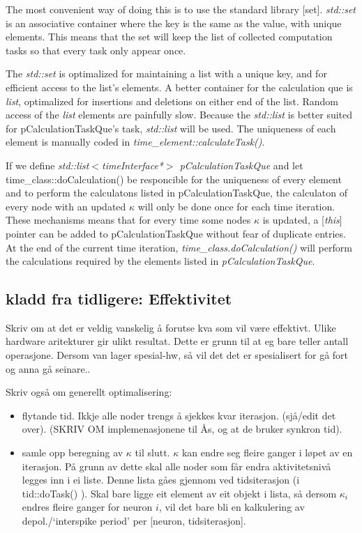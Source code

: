 The most convenient way of doing this is to use the standard library [set]. %
\emph{std::set} is an associative container where the key is the same as the value, with unique elements. %
This means that the set will keep the list of collected computation tasks so that every task only appear once.

The \emph{std::set} is optimalized for maintaining a list with a unique key, and for efficient access to the list's elements. 
A better container for the calculation que is \emph{list}, optimalized for insertions and deletions on either end of the list. Random access of the \emph{list} elements are painfully slow\cite{Stroustrup2000KAP17}.
Because the \emph{std::list} is better suited for pCalculationTaskQue's task, \emph{std::list} will be used.
The uniqueness of each element is manually coded in \emph{time\_element::calculateTask()}.

If we define \emph{std::list$<$timeInterface*$>$ pCalculationTaskQue} and let time\_class::doCalculation() be responcible for the uniqueness of every element and to perform the calculatons listed in pCalculationTaskQue, 
	the calculaton of every node with an updated $\kappa$ will only be done once for each time iteration.
These mechanisms means that for every time some nodes $\kappa$ is updated, a [\emph{this}] pointer can be added to pCalculationTaskQue without fear of duplicate entries. 
At the end of the current time iteration, \emph{time\_class.doCalculation()} will perform the calculations required by the elements listed in \emph{pCalculationTaskQue}.    %




\subsection{kladd fra tidligere: Effektivitet}
Skriv om at det er veldig vanskelig å forutse kva som vil være effektivt. Ulike hardware aritekturer gir  ulikt resultat. Dette er grunn til at eg bare teller antall operasjone. Dersom van lager spesial-hw, så vil det det er spesialisert for gå fort og anna gå seinare..

Skriv også om generellt optimalisering:
\begin{itemize}
	\item flytande tid. Ikkje alle noder trengs å sjekkes kvar iterasjon. (sjå/edit det over). (SKRIV OM implemenasjonene til Ås, og at de bruker synkron tid).
	\item samle opp beregning av $\kappa$ til slutt. $\kappa$ kan endre seg fleire ganger i løpet av en iterasjon. På grunn av dette skal alle noder som får endra aktivitetsnivå legges inn i ei liste. Denne lista gåes gjennom ved tidsiterasjon (i tid::doTask() ). Skal bare ligge eit element av eit objekt i lista, så dersom $\kappa_i$ endres fleire ganger for neuron $i$, vil det bare bli en kalkulering av depol./`interspike period' per [neuron, tidsiterasjon].
\end{itemize}

